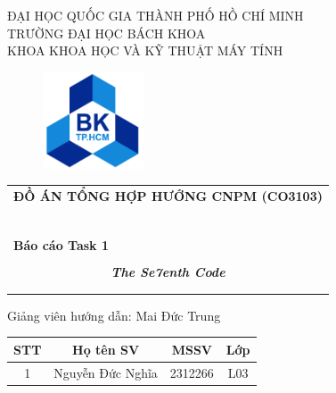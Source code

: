 \documentclass[a4paper]{article}
\begin{document}
\begin{titlepage}
\begin{center}
\large{ĐẠI HỌC QUỐC GIA THÀNH PHỐ HỒ CHÍ MINH} \\
TRƯỜNG ĐẠI HỌC BÁCH KHOA \\
KHOA KHOA HỌC VÀ KỸ THUẬT MÁY TÍNH
\end{center}

\vspace{1cm}

\begin{figure}[h!]
\begin{center}
\includegraphics[width=3cm]{image/logo.png}
\end{center}
\end{figure}

\vspace{0.8cm}


\begin{center}
\begin{tabular}{c}
\multicolumn{1}{l}{\textbf{{\Large ĐỒ ÁN TỔNG HỢP HƯỚNG CNPM (CO3103)}}}\\
~~\\
\hline
\\
\multicolumn{1}{l}{\textbf{{Báo cáo Task 1}}}\\
\\
\textbf{\textit{{\huge The Se7enth Code}}}\\
\textbf{\textit{{\huge }}}\\
\\
\hline
\end{tabular}
\end{center}

\vspace{0.2cm}
\begin{center}
Giảng viên hướng dẫn:  Mai Đức Trung\\
\vspace{0.7cm}
\begin{tabular}{|c|c|c|c|}
\hline
\textbf{STT} & \textbf{Họ tên SV} & \textbf{MSSV} & \textbf{Lớp} \\
\hline 
{1} & {Nguyễn Đức Nghĩa}& {2312266} & {L03}\\
 

\end{tabular}
\end{center}
\end{titlepage}
\end{document}
